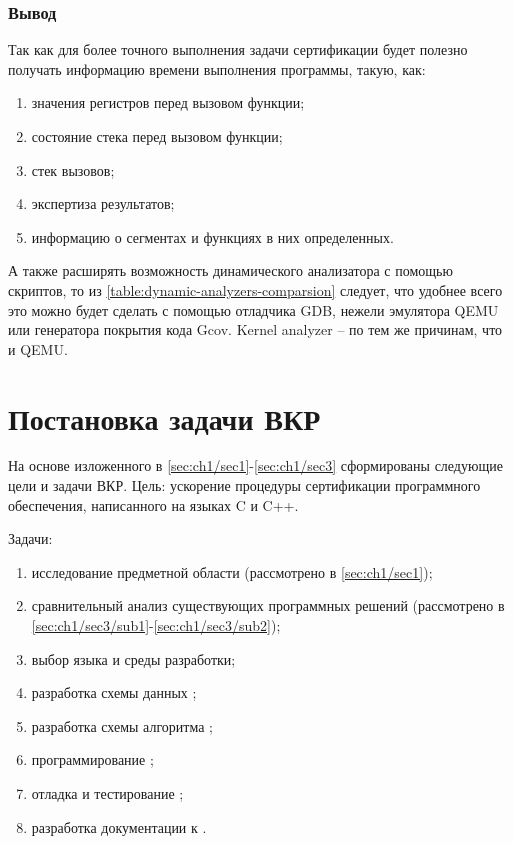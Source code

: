\subsubsection{Вывод}\label{sec:ch1/sec3/sub2/sub4}
Так как для более точного выполнения задачи сертификации будет полезно получать
информацию времени выполнения программы, такую, как:
\begin{enumerate}[label={\arabic*)}]
    \item значения регистров перед вызовом функции;
    \item состояние стека перед вызовом функции;
    \item стек вызовов;
    \item экспертиза результатов;
    \item информацию о сегментах и функциях в них определенных.
\end{enumerate}
А также расширять возможность динамического анализатора с помощью скриптов,
то из \autoref{table:dynamic-analyzers-comparsion} следует, что
удобнее всего это можно будет сделать с помощью отладчика GDB,
нежели эмулятора QEMU или генератора покрытия кода Gcov. Kernel analyzer --
по тем же причинам, что и QEMU.


\section{Постановка задачи ВКР}\label{sec:ch1/sec4}
На основе изложенного в \autoref{sec:ch1/sec1}-\autoref{sec:ch1/sec3} сформированы
следующие цели и задачи ВКР.
Цель: ускорение процедуры сертификации программного обеспечения, написанного
на языках C и C++.

Задачи:
\begin{enumerate}[label={\arabic*)}]
    \item исследование предметной области (рассмотрено в \autoref{sec:ch1/sec1});
    \item сравнительный анализ существующих программных решений 
        (рассмотрено в \autoref{sec:ch1/sec3/sub1}-\autoref{sec:ch1/sec3/sub2});
    \item выбор языка и среды разработки;
    \item разработка схемы данных {\ProgModule};
    \item разработка схемы алгоритма {\ProgModule};
    \item программирование {\ProgModule};
    \item отладка и тестирование {\ProgModule};
    \item разработка документации к {\ProgModule}.
\end{enumerate}

